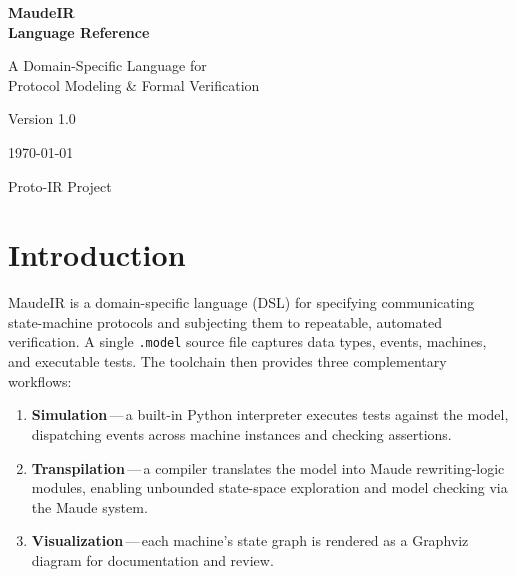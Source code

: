 \documentclass[11pt,letterpaper]{article}
\begin{document}
\begin{titlepage}
\centering
\vspace*{3cm}
{\Huge\bfseries MaudeIR\\[0.3em]Language Reference\par}
\vspace{1cm}
{\Large A Domain-Specific Language for\\Protocol Modeling \& Formal Verification\par}
\vspace{2cm}
{\large Version 1.0\par}
\vspace{0.5cm}
{\large\today\par}
\vfill
{\small Proto-IR Project}
\end{titlepage}

\tableofcontents
\newpage

\section{Introduction}
\label{sec:introduction}

MaudeIR is a domain-specific language (DSL) for specifying communicating
state-machine protocols and subjecting them to repeatable, automated
verification.  A single \texttt{.model} source file captures data types,
events, machines, and executable tests.  The toolchain then provides three
complementary workflows:

\begin{enumerate}
  \item \textbf{Simulation}\,---\,a built-in Python interpreter executes
        tests against the model, dispatching events across machine instances
        and checking assertions.
  \item \textbf{Transpilation}\,---\,a compiler translates the model into
        Maude rewriting-logic modules, enabling unbounded state-space
        exploration and model checking via the Maude system.
  \item \textbf{Visualization}\,---\,each machine's state graph is
        rendered as a Graphviz diagram for documentation and review.
\end{enumerate}
\end{document}
